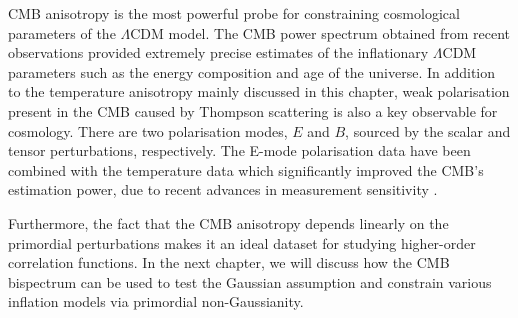 CMB anisotropy is the most powerful probe for constraining cosmological parameters of the $\Lambda$CDM model. The CMB power spectrum obtained from recent observations provided extremely precise estimates of the inflationary $\Lambda$CDM parameters such as the energy composition and age of the universe. In addition to the temperature anisotropy mainly discussed in this chapter, weak polarisation present in the CMB caused by Thompson scattering is also a key observable for cosmology. There are two polarisation modes, $E$ and $B$, sourced by the scalar and tensor perturbations, respectively. The E-mode polarisation data have been combined with the temperature data which significantly improved the CMB's estimation power, due to recent advances in measurement sensitivity \cite{PlanckCollaboration2018Parameters}. 

Furthermore, the fact that the CMB anisotropy depends linearly on the primordial perturbations makes it an ideal dataset for studying higher-order correlation functions. In the next chapter, we will discuss how the CMB bispectrum can be used to test the Gaussian assumption and constrain various inflation models via primordial non-Gaussianity.